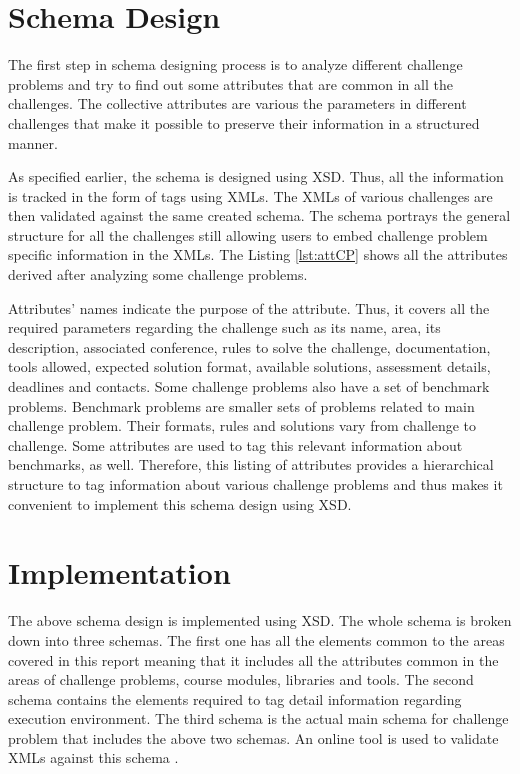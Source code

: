 \documentclass[11pt,letterpaper]{report}
\begin{document}
\section{Schema Design} 
The first step in schema designing process is to analyze different challenge problems and try to find out some attributes that are common in all the challenges. The collective attributes  are various the parameters in different challenges that make it possible to preserve their information in a structured manner. 

As specified earlier, the schema is designed using XSD. Thus, all the information is tracked in the form of tags using XMLs. The XMLs of various challenges are then validated against the same created schema. The schema portrays the general structure for all the challenges still allowing users to embed challenge problem specific information in the XMLs. The Listing \ref{lst:attCP} shows all the attributes derived after analyzing some challenge problems.



\bigskip
Attributes' names indicate the purpose of the attribute. Thus, it covers all the required parameters regarding the challenge such as its name, area, its description, associated conference, rules to solve the challenge, documentation, tools allowed, expected solution format, available solutions, assessment details, deadlines and contacts. Some challenge problems also have a set of benchmark problems. Benchmark problems are smaller sets of problems related to main challenge problem. Their formats, rules and solutions vary from challenge to challenge. Some attributes are used to tag this relevant information about benchmarks, as well. Therefore, this listing of attributes provides a hierarchical structure to tag information about various challenge problems and thus makes it convenient to implement this schema design using XSD.

\section{Implementation}
The above schema design is implemented using XSD. The whole schema is broken down into three schemas. The first one has all the elements common to the areas covered in this report meaning that it includes all the attributes common in the areas of challenge problems, course modules, libraries and tools. The second schema contains the elements required to tag detail information regarding execution environment. The third schema is the actual main schema for challenge problem that includes the above two schemas. An online tool is used to validate XMLs against this schema \cite{olXSD}.
\end{document}
